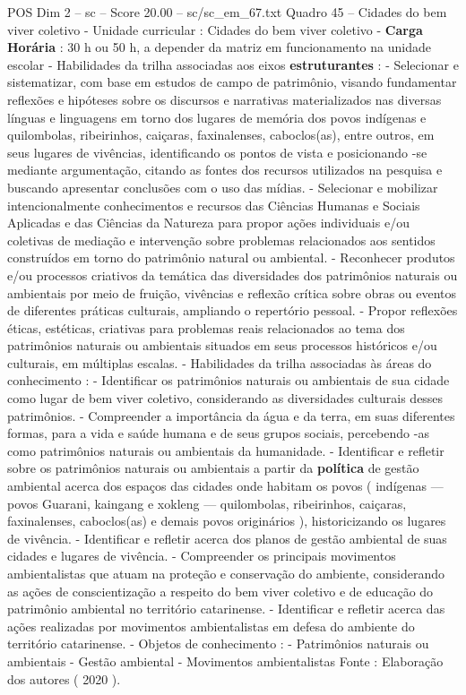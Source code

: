\begin{textsample}{POS Dim 2 – sc – Score 20.00 – sc/sc\_em\_67.txt}
Quadro 45 – Cidades do bem viver coletivo - Unidade curricular : Cidades do bem viver coletivo - \textbf{Carga} \textbf{Horária} : 30 h ou 50 h, a depender da matriz em funcionamento na unidade escolar - Habilidades da trilha associadas aos eixos \textbf{estruturantes} : - Selecionar e sistematizar, com base em estudos de campo de patrimônio, visando fundamentar reflexões e hipóteses sobre os discursos e narrativas materializados nas diversas línguas e linguagens em torno dos lugares de memória dos povos indígenas e quilombolas, ribeirinhos, caiçaras, faxinalenses, caboclos(as), entre outros, em seus lugares de vivências, identificando os pontos de vista e posicionando -se mediante argumentação, citando as fontes dos recursos utilizados na pesquisa e buscando apresentar conclusões com o uso das mídias. - Selecionar e mobilizar intencionalmente conhecimentos e recursos das Ciências Humanas e Sociais Aplicadas e das Ciências da Natureza para propor ações individuais e/ou coletivas de mediação e intervenção sobre problemas relacionados aos sentidos construídos em torno do patrimônio natural ou ambiental. - Reconhecer produtos e/ou processos criativos da temática das diversidades dos patrimônios naturais ou ambientais por meio de fruição, vivências e reflexão crítica sobre obras ou eventos de diferentes práticas culturais, ampliando o repertório pessoal. - Propor reflexões éticas, estéticas, criativas para problemas reais relacionados ao tema dos patrimônios naturais ou ambientais situados em seus processos históricos e/ou culturais, em múltiplas escalas. - Habilidades da trilha associadas às áreas do conhecimento : - Identificar os patrimônios naturais ou ambientais de sua cidade como lugar de bem viver coletivo, considerando as diversidades culturais desses patrimônios. - Compreender a importância da água e da terra, em suas diferentes formas, para a vida e saúde humana e de seus grupos sociais, percebendo -as como patrimônios naturais ou ambientais da humanidade. - Identificar e refletir sobre os patrimônios naturais ou ambientais a partir da \textbf{política} de gestão ambiental acerca dos espaços das cidades onde habitam os povos ( indígenas — povos Guarani, kaingang e xokleng — quilombolas, ribeirinhos, caiçaras, faxinalenses, caboclos(as) e demais povos originários ), historicizando os lugares de vivência. - Identificar e refletir acerca dos planos de gestão ambiental de suas cidades e lugares de vivência. - Compreender os principais movimentos ambientalistas que atuam na proteção e conservação do ambiente, considerando as ações de conscientização a respeito do bem viver coletivo e de educação do patrimônio ambiental no território catarinense. - Identificar e refletir acerca das ações realizadas por movimentos ambientalistas em defesa do ambiente do território catarinense. - Objetos de conhecimento : - Patrimônios naturais ou ambientais - Gestão ambiental - Movimentos ambientalistas Fonte : Elaboração dos autores ( 2020 ).

\end{textsample}
